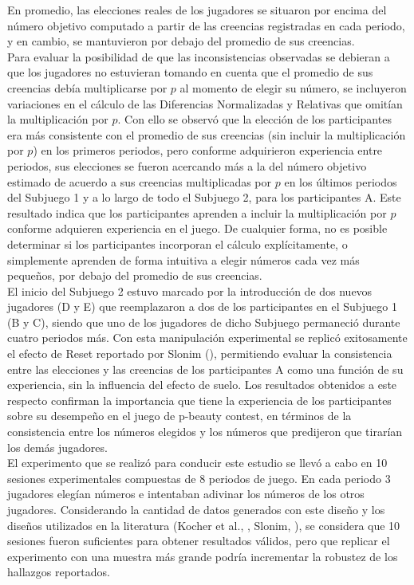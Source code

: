 En promedio, las elecciones reales de los jugadores se situaron por encima del número objetivo computado a partir de las creencias registradas en cada periodo, y en cambio, se mantuvieron por debajo del promedio de sus creencias.\\

Para evaluar la posibilidad de que las inconsistencias observadas se debieran a que los jugadores no estuvieran tomando en cuenta que el promedio de sus creencias debía multiplicarse por $p$ al momento de elegir su número, se incluyeron variaciones en el cálculo de las Diferencias Normalizadas y Relativas que omitían la multiplicación por $p$. Con ello se observó que la elección de los participantes era más consistente con el promedio de sus creencias (sin incluir la multiplicación por $p$) en los primeros periodos, pero conforme adquirieron experiencia entre periodos, sus elecciones se fueron acercando más a la del número objetivo estimado de acuerdo a sus creencias multiplicadas por $p$ en los últimos periodos del Subjuego 1 y a lo largo de todo el Subjuego 2, para los participantes A. Este resultado indica que los participantes aprenden a incluir la multiplicación por $p$ conforme adquieren experiencia en el juego. De cualquier forma, no es posible determinar si los participantes incorporan el cálculo explícitamente, o simplemente aprenden de forma intuitiva a elegir números cada vez más pequeños, por debajo del promedio de sus creencias.\\

El inicio del Subjuego 2 estuvo marcado por la introducción de dos nuevos jugadores (D y E) que reemplazaron a dos de los participantes en el Subjuego 1 (B y C), siendo que uno de los jugadores de dicho Subjuego permaneció durante cuatro periodos más. Con esta manipulación experimental se replicó exitosamente el efecto de Reset reportado por Slonim (\citeyear{Slonim}), permitiendo evaluar la consistencia entre las elecciones y las creencias de los participantes A como una función de su experiencia, sin la influencia del efecto de suelo. Los resultados obtenidos a este respecto confirman la importancia que tiene la experiencia de los participantes sobre su desempeño en el juego de p-beauty contest, en términos de la consistencia entre los números elegidos y los números que predijeron que tirarían los demás jugadores. \\

El experimento que se realizó para conducir este estudio se llevó a cabo en 10 sesiones experimentales compuestas de 8 periodos de juego. En cada periodo 3 jugadores elegían números e intentaban adivinar los números de los otros jugadores. Considerando la cantidad de datos generados con este diseño y los diseños utilizados en la literatura (Kocher et al., \citeyear{Kocher}, Slonim, \citeyear{Slonim}), se considera que 10 sesiones fueron suficientes para obtener resultados válidos, pero que replicar el experimento con una muestra más grande podría incrementar la robustez de los hallazgos reportados.\\

